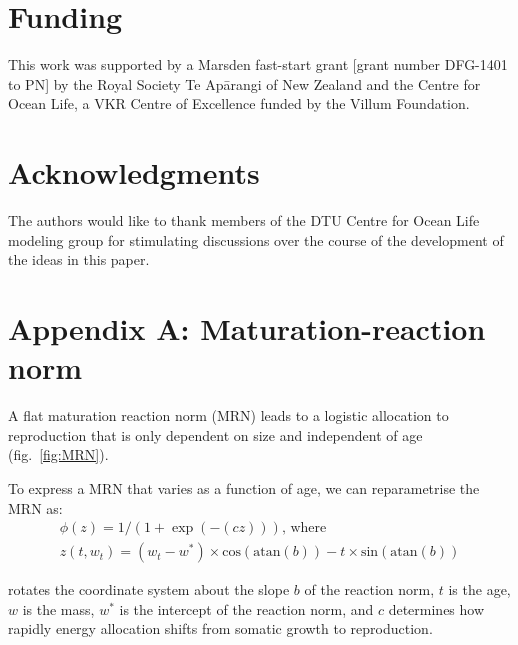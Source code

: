 \documentclass[11pt]{article}\usepackage[]{graphicx}\usepackage[]{color,soul}
\begin{document}
\section*{Funding}

This work was supported by a Marsden fast-start grant [grant number DFG-1401 to PN] by the Royal Society Te Apārangi of New Zealand and the Centre for Ocean Life, a VKR Centre of Excellence funded by the Villum Foundation.

 \section*{Acknowledgments}
 
 The authors would like to thank members of the DTU Centre for Ocean Life modeling group for stimulating discussions over the course of the development of the ideas in this paper. 

\newpage{}


\section*{Appendix A: Maturation-reaction norm}
\label{sec:MRN}

A flat maturation reaction norm (MRN) leads to a logistic allocation to reproduction that is only dependent on size and independent of age (fig.~\ref{fig:MRN}).

To express a MRN that varies as a function of age, we can reparametrise the MRN as:
\begin{align}
\phi(z) = 1/(1+\exp(-(c z))) \text{, where }\\
z(t, w_t) = (w_t-w^*)\times \text{cos}(\text{atan}(b))-t\times \text{sin}(\text{atan}(b))
\end{align}

rotates the coordinate system about the slope $b$ of the reaction norm, $t$ is the age, $w$ is the mass, $w^*$ is the intercept of the reaction norm, and $c$ determines how rapidly energy allocation shifts from somatic growth to reproduction. 

\newpage
\end{document}
